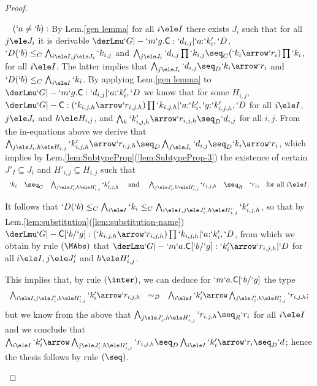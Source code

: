\documentclass{lmcs}
\begin{document}
\begin{proof}
\begin{description}
~\kern-10mm $(`a \neq `b):$
By Lem.\skp\ref{gen lemma} for all $i\ele I$ there exists $J_i$ such that
for all $j\ele J_i$ it is derivable $\derLmu `G |- {`m`g.\Cmd} : `d_{i,j} | `a{:}`k'_i,`D $,
$`D(`b) \leq_C \bigwedge_{i\ele I,j\ele J_i} `k_{i,j}$ and $\bigwedge_{j\ele J_i} `d_{i,j}\prod`k_{i,j} 
\seq_C (`k_i\arrow`r_i)\prod`k_i$, for all $i\ele I$. The latter implies that 
$\bigwedge_{j\ele J_i} `d_{i,j} \seq_D `k_i\arrow`r_i$ and
$`D(`b) \leq_C \bigwedge_{i\ele I}`k_i$. 
%
By applying Lem.\skp\ref{gen lemma} to $\derLmu `G |- {`m`g.\Cmd} : `d_{i,j} | `a{:}`k'_i,`D $ we know that for some $H_{i,j}$,
$\derLmu `G |- {\Cmd} : (`k_{i,j,h}\arrow`r_{i,j,h})\prod`k_{i,j,h} | `a{:}`k'_i, `g{:}`k'_{i,j,h},`D $
for all $i\ele I$, $j\ele J_i$ and $h\ele H_{i,j}$, and $\bigwedge_{h} `k'_{i,j,h}\arrow`r_{i,j,h} \seq_D `d_{i,j}$ for all $i,j$.
%
From the in-equations above we derive that 
$\bigwedge_{j\ele J_i,h\ele H_{i,j}} `k'_{i,j,h}\arrow`r_{i,j,h} \seq_D \bigwedge_{j\ele J_i}`d_{i,j} \seq_D `k_i\arrow`r_i$, 
which
implies by Lem.\skp\ref{lem:SubtypeProp}\skp(\ref{lem:SubtypeProp-3}) 
the existence of certain $J'_I \subseteq J_i$ and $H'_{i,j} \subseteq H_{i,j}$ such that
\[ \begin{array}{rcl@{\quad}c@{\quad}rcl@{\quad}l}
`k_i &\seq_C& \bigwedge_{j\ele J'_i,h\ele H'_{i,j}} `k'_{i,j,h}
&\textrm{ and } &
\bigwedge_{j\ele J'_i,h\ele H'_{i,j}} `r_{i,j,h} &\seq_R& `r_i, & 
\textrm{for all }i\ele I.
 \end{array} \]

It follows that $`D(`b) \leq_C \bigwedge_{i\ele I}`k_i \leq_C \bigwedge_{i\ele I,j\ele J'_i,h\ele H'_{i,j}} `k'_{i,j,h}$, so that
by Lem.\skp\ref{lem:substitution}\skp(\ref{lem:substitution-name}) 
$\derLmu `G |- {\Cmd[`b/`g]} : (`k_{i,j,h}\arrow`r_{i,j,h})\prod`k_{i,j,h} | `a{:}`k'_i,`D $, from which we 
obtain by rule $(\MAbs)$ that 
$\derLmu `G |- {`m`a.\Cmd[`b/`g]} : `k'_i\arrow`r_{i,j,h} | `D $
for all $i\ele I, j\ele J'_i$ and $h\ele H'_{i,j}$.

This implies that, by rule $(\inter)$, we can deduce for $`m`a.\textrm{\sf C}[`b/`g]$ the type 
 \[ \begin{array}{rcl} 
\bigwedge_{i\ele I, j\ele J'_i,h\ele H'_{i,j}} `k'_i\arrow`r_{i,j,h} &\sim_D& 
\bigwedge_{i\ele I} `k'_i\arrow\bigwedge_{j\ele J'_i,h\ele H'_{i,j}}`r_{i,j,h} ;
 \end{array} \] 
but we know from the above that $\bigwedge_{j\ele J'_i,h\ele H'_{i,j}}`r_{i,j,h} \seq_R `r_i$ for all $i\ele I$ and we conclude that
$\bigwedge_{i\ele I} `k'_i\arrow\bigwedge_{j\ele J'_i,h\ele H'_{i,j}}`r_{i,j,h} \seq_D \bigwedge_{i\ele I} `k'_i\arrow`r_i
\seq_D `d$; hence the thesis follows by rule $(\seq)$.
	

\end{description}
\end{proof}
\end{document}
